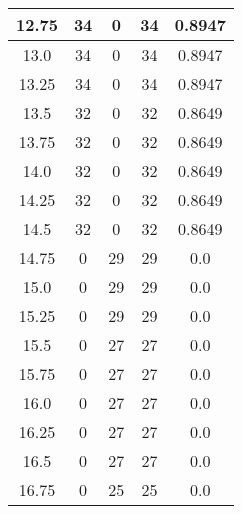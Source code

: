 \documentclass[letterpaper, 12pt]{article}
\begin{document}
\begin{longtable}{|c|c|c|c|c|}
\hline
12.75 & 34 & 0 & 34 & 0.8947 \\
\hline
13.0 & 34 & 0 & 34 & 0.8947 \\
\hline
13.25 & 34 & 0 & 34 & 0.8947 \\
\hline
13.5 & 32 & 0 & 32 & 0.8649 \\
\hline
13.75 & 32 & 0 & 32 & 0.8649 \\
\hline
14.0 & 32 & 0 & 32 & 0.8649 \\
\hline
14.25 & 32 & 0 & 32 & 0.8649 \\
\hline
14.5 & 32 & 0 & 32 & 0.8649 \\
\hline
14.75 & 0 & 29 & 29 & 0.0 \\
\hline
15.0 & 0 & 29 & 29 & 0.0 \\
\hline
15.25 & 0 & 29 & 29 & 0.0 \\
\hline
15.5 & 0 & 27 & 27 & 0.0 \\
\hline
15.75 & 0 & 27 & 27 & 0.0 \\
\hline
16.0 & 0 & 27 & 27 & 0.0 \\
\hline
16.25 & 0 & 27 & 27 & 0.0 \\
\hline
16.5 & 0 & 27 & 27 & 0.0 \\
\hline
16.75 & 0 & 25 & 25 & 0.0 \\
\hline
\end{longtable}
\end{document}
